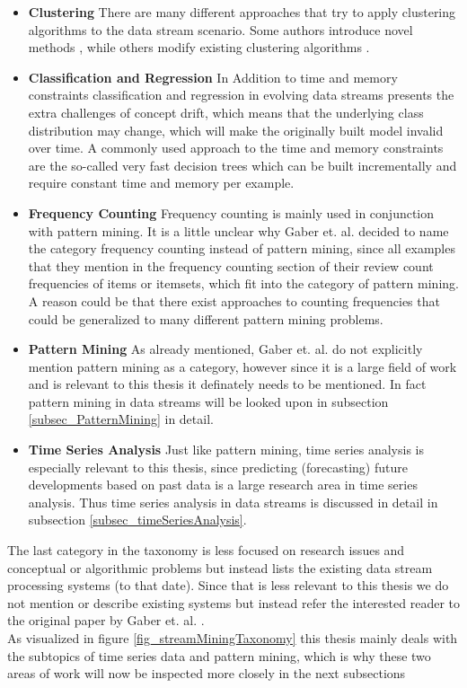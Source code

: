 \begin{itemize}
	\item \textbf{Clustering} There are many different approaches that try to apply clustering algorithms to the data stream scenario. Some authors introduce novel methods \cite{aggarwal2003framework} \cite{aggarwal2004framework}, while others modify existing clustering algorithms \cite{guha2000clustering}.
	\item \textbf{Classification and Regression} In Addition to time and memory constraints classification and regression in evolving data streams presents the extra challenges of concept drift, which means that the underlying class distribution may change, which will make the originally built model invalid over time. A commonly used approach to the time and memory constraints are the so-called very fast decision trees \cite{domingos2000mining} which can be built incrementally and require constant time and memory per example.
	\item \textbf{Frequency Counting} Frequency counting is mainly used in conjunction with pattern mining. It is a little unclear why Gaber et. al. decided to name the category frequency counting instead of pattern mining, since all examples that they mention in the frequency counting section of their review count frequencies of items or itemsets, which fit into the category of pattern mining. A reason could be that there exist approaches to counting frequencies that could be generalized to many different pattern mining problems.
	\item \textbf{Pattern Mining} As already mentioned, Gaber et. al. do not explicitly mention pattern mining as a category, however since it is a large field of work and is relevant to this thesis it definately needs to be mentioned. In fact pattern mining in data streams will be looked upon in subsection \ref{subsec_PatternMining} in detail. 
	\item \textbf{Time Series Analysis} Just like pattern mining, time series analysis is especially relevant to this thesis, since predicting (forecasting) future developments based on past data is a large research area in time series analysis. Thus time series analysis in data streams is discussed in detail in subsection \ref{subsec_timeSeriesAnalysis}.
\end{itemize}

The last category in the taxonomy is less focused on research issues and conceptual or algorithmic problems but instead lists the existing data stream processing systems (to that date). Since that is less relevant to this thesis we do not mention or describe existing systems but instead refer the interested reader to the original paper by Gaber et. al. \cite{gaber2005mining}. \\
As visualized in figure \ref{fig_streamMiningTaxonomy} this thesis mainly deals with the subtopics of time series data and pattern mining, which is why these two areas of work will now be inspected more closely in the next subsections

